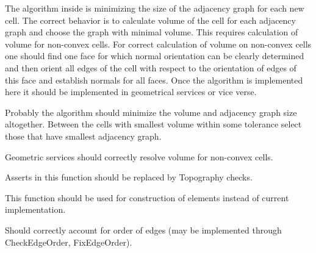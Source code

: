 \begin{DoxyRefList}
\begin{DoxyEnumerate}
\end{DoxyEnumerate}
\item[\label{todo__todo000005}%
\hypertarget{todo__todo000005}{}%
Member \hyperlink{classINMOST_1_1Cell_afd127d2e41a4b4362dc3399d9ac96a59}{I\-N\-M\-O\-S\-T\-:\-:Cell\-:\-:Split\-Cell} (Cell cell, const Element\-Array$<$ Face $>$ \&faces, Marker\-Type del\-\_\-protect)]
\begin{DoxyEnumerate}
\item The algorithm inside is minimizing the size of the adjacency graph for each new cell. The correct behavior is to calculate volume of the cell for each adjacency graph and choose the graph with minimal volume. This requires calculation of volume for non-\/convex cells. For correct calculation of volume on non-\/convex cells one should find one face for which normal orientation can be clearly determined and then orient all edges of the cell with respect to the orientation of edges of this face and establish normals for all faces. Once the algorithm is implemented here it should be implemented in geometrical services or vice verse.
\item Probably the algorithm should minimize the volume and adjacency graph size altogether. Between the cells with smallest volume within some tolerance select those that have smallest adjacency graph.  
\end{DoxyEnumerate}
\item[\label{todo__todo000007}%
\hypertarget{todo__todo000007}{}%
Member \hyperlink{classINMOST_1_1Cell_ae0caec87803ddd108c4fb06decf69e18}{I\-N\-M\-O\-S\-T\-:\-:Cell\-:\-:Volume} () const ]
\begin{DoxyEnumerate}
\item Geometric services should correctly resolve volume for non-\/convex cells.  
\end{DoxyEnumerate}
\item[\label{todo__todo000001}%
\hypertarget{todo__todo000001}{}%
Member \hyperlink{classINMOST_1_1Element_a96bd136b0f249c958fc8632553aa3b58}{I\-N\-M\-O\-S\-T\-:\-:Element\-:\-:Connect} (const Handle\-Type $\ast$adjacent, I\-N\-M\-O\-S\-T\-\_\-\-D\-A\-T\-A\-\_\-\-E\-N\-U\-M\-\_\-\-T\-Y\-P\-E num) const ]
\begin{DoxyEnumerate}
\item Asserts in this function should be replaced by Topography checks.
\item This function should be used for construction of elements instead of current implementation.
\item Should correctly account for order of edges (may be implemented through Check\-Edge\-Order, Fix\-Edge\-Order).  

\end{DoxyEnumerate}
\end{DoxyRefList}
